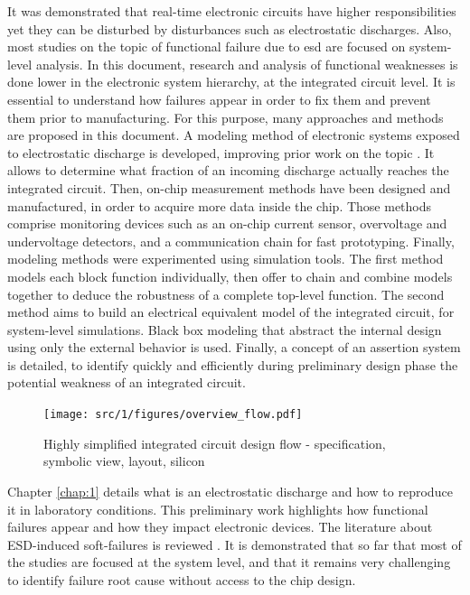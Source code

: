 It was demonstrated that real-time electronic circuits have higher responsibilities yet they can be disturbed by disturbances such as electrostatic discharges.
Also, most studies on the topic of functional failure due to \gls{esd} are focused on system-level analysis.
In this document, research and analysis of functional weaknesses is done lower in the electronic system hierarchy, at the integrated circuit level.
It is essential to understand how failures appear in order to fix them and prevent them prior to manufacturing.
For this purpose, many approaches and methods are proposed in this document.
A modeling method of electronic systems exposed to electrostatic discharge is developed, improving prior work on the topic \cite{phd-lacrampe, phd-monnereau}.
It allows to determine what fraction of an incoming discharge actually reaches the integrated circuit.
Then, on-chip measurement methods have been designed and manufactured, in order to acquire more data inside the chip.
Those methods comprise monitoring devices such as an on-chip current sensor, overvoltage and undervoltage detectors, and a communication chain for fast prototyping.
Finally, modeling methods were experimented using simulation tools.
The first method models each block function individually, then offer to chain and combine models together to deduce the robustness of a complete top-level function.
The second method aims to build an electrical equivalent model of the integrated circuit, for system-level simulations.
Black box modeling that abstract the internal design using only the external behavior is used.
Finally, a concept of an assertion system is detailed, to identify quickly and efficiently during preliminary design phase the potential weakness of an integrated circuit.

\begin{figure}[!h]
  \centering
  \texttt{[image: src/1/figures/overview\_flow.pdf]}
  \caption{Highly simplified integrated circuit design flow - specification, symbolic view, layout, silicon}
  \label{fig:ic-design-flow}
\end{figure}

%
Chapter \ref{chap:1} details what is an electrostatic discharge and how to reproduce it in laboratory conditions.
This preliminary work highlights how functional failures appear and how they impact electronic devices.
The literature about ESD-induced soft-failures is reviewed .
It is demonstrated that so far that most of the studies are focused at the system level, and that it remains very challenging to identify failure root cause without access to the chip design.


